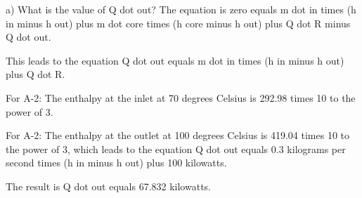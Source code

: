 a) What is the value of Q dot out? The equation is zero equals m dot in times (h in minus h out) plus m dot core times (h core minus h out) plus Q dot R minus Q dot out.

This leads to the equation Q dot out equals m dot in times (h in minus h out) plus Q dot R.

For A-2: The enthalpy at the inlet at 70 degrees Celsius is 292.98 times 10 to the power of 3.

For A-2: The enthalpy at the outlet at 100 degrees Celsius is 419.04 times 10 to the power of 3, which leads to the equation Q dot out equals 0.3 kilograms per second times (h in minus h out) plus 100 kilowatts.

The result is Q dot out equals 67.832 kilowatts.